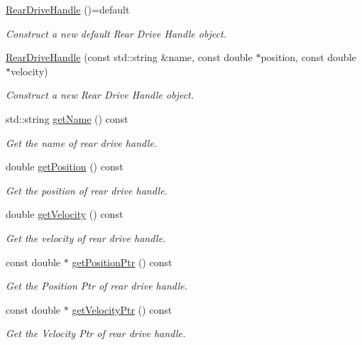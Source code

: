 \begin{DoxyCompactItemize}
\item 
\mbox{\label{classhardware__interface_1_1RearDriveHandle_aadc121a01d6ffc14eb56f372b399a199}} 
\hyperlink{classhardware__interface_1_1RearDriveHandle_aadc121a01d6ffc14eb56f372b399a199}{Rear\+Drive\+Handle} ()=default
\begin{DoxyCompactList}\small\item\em Construct a new default Rear Drive Handle object. \end{DoxyCompactList}\item 
\hyperlink{classhardware__interface_1_1RearDriveHandle_a313af502b28ff7b237b789e44093464c}{Rear\+Drive\+Handle} (const std\+::string \&name, const double $\ast$position, const double $\ast$velocity)
\begin{DoxyCompactList}\small\item\em Construct a new Rear Drive Handle object. \end{DoxyCompactList}\item 
std\+::string \hyperlink{classhardware__interface_1_1RearDriveHandle_a2295641b8ecad58b7064957c64ce28f4}{get\+Name} () const
\begin{DoxyCompactList}\small\item\em Get the name of rear drive handle. \end{DoxyCompactList}\item 
double \hyperlink{classhardware__interface_1_1RearDriveHandle_a214b6bdb767de7f7a4808a03bc95e72a}{get\+Position} () const
\begin{DoxyCompactList}\small\item\em Get the position of rear drive handle. \end{DoxyCompactList}\item 
double \hyperlink{classhardware__interface_1_1RearDriveHandle_ad132a1d990940ed9578824c5084b702b}{get\+Velocity} () const
\begin{DoxyCompactList}\small\item\em Get the velocity of rear drive handle. \end{DoxyCompactList}\item 
const double $\ast$ \hyperlink{classhardware__interface_1_1RearDriveHandle_a003b235bf0a2b64571aa8179d2687664}{get\+Position\+Ptr} () const
\begin{DoxyCompactList}\small\item\em Get the Position Ptr of rear drive handle. \end{DoxyCompactList}\item 
const double $\ast$ \hyperlink{classhardware__interface_1_1RearDriveHandle_a02f8ff9ba88c2642d71ebdafad9122c1}{get\+Velocity\+Ptr} () const
\begin{DoxyCompactList}\small\item\em Get the Velocity Ptr of rear drive handle. \end{DoxyCompactList}\end{DoxyCompactItemize}


